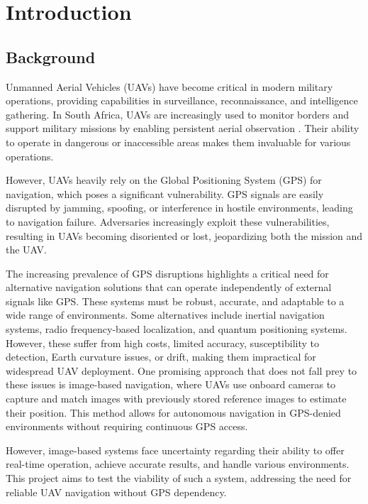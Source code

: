 \graphicspath{{introduction/fig/}}

\chapter{Introduction}
\label{chap:introduction}




\section{Background}
Unmanned Aerial Vehicles (UAVs) have become critical in modern military operations, providing capabilities in surveillance, reconnaissance, and intelligence gathering. In South Africa, UAVs are increasingly used to monitor borders and support military missions by enabling persistent aerial observation \cite{Weiss2024}. Their ability to operate in dangerous or inaccessible areas makes them invaluable for various operations.

However, UAVs heavily rely on the Global Positioning System (GPS) for navigation, which poses a significant vulnerability. GPS signals are easily disrupted by jamming, spoofing, or interference in hostile environments, leading to navigation failure. Adversaries increasingly exploit these vulnerabilities, resulting in UAVs becoming disoriented or lost, jeopardizing both the mission and the UAV. 

The increasing prevalence of GPS disruptions highlights a critical need for alternative navigation solutions that can operate independently of external signals like GPS. These systems must be robust, accurate, and adaptable to a wide range of environments. Some alternatives include inertial navigation systems, radio frequency-based localization, and quantum positioning systems. However, these suffer from high costs, limited accuracy, susceptibility to detection, Earth curvature issues, or drift, making them impractical for widespread UAV deployment. One promising approach that does not fall prey to these issues is image-based navigation, where UAVs use onboard cameras to capture and match images with previously stored reference images to estimate their position. This method allows for autonomous navigation in GPS-denied environments without requiring continuous GPS access.

However, image-based systems face uncertainty regarding their ability to offer real-time operation, achieve accurate results, and handle various environments. This project aims to test the viability of such a system, addressing the need for reliable UAV navigation without GPS dependency.

